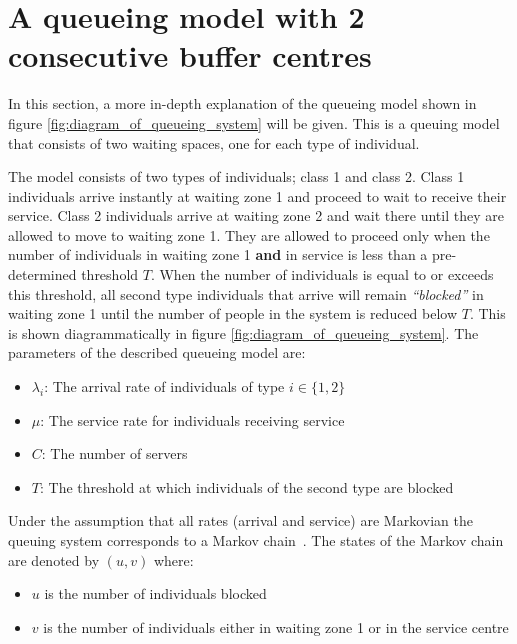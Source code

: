 \section{A queueing model with 2 consecutive buffer centres}

In this section, a more in-depth explanation of the queueing model shown in 
figure \ref{fig:diagram_of_queueing_system} will be given.
This is a queuing model that consists of two waiting spaces, one for each type
of individual.

The model consists of two types of individuals; class 1 and class 2.
Class 1 individuals arrive instantly at waiting zone 1 and proceed to wait to
receive their service. 
Class 2 individuals arrive at waiting zone 2 and wait there until they are 
allowed to move to waiting zone 1. 
They are allowed to proceed only when the number of 
individuals in waiting zone 1 \textbf{and} in service is less than a 
pre-determined threshold \(T\).
When the number of individuals is equal to or exceeds this threshold, all second type individuals that arrive will remain 
\textit{``blocked''} in waiting zone 1 until the number of people in the 
system is reduced below \(T\). 
This is shown diagrammatically in figure \ref{fig:diagram_of_queueing_system}.
The parameters of the described queueing model are:

\begin{itemize}
    \item \(\lambda_i\): The arrival rate of individuals of type \(i\in\{1, 2\}\)
    \item \(\mu\): The service rate for individuals receiving service
    \item \(C\): The number of servers
    \item \(T\): The threshold at which individuals of the second type are blocked
\end{itemize}

Under the assumption that all rates (arrival and service) are Markovian the
queuing system corresponds to a Markov chain~\cite{kemeny1976markov}.
The states of the Markov chain are denoted by \((u,v)\) where:

\begin{itemize}
    \item \(u\) is the number of individuals blocked
    \item \(v\) is the number of individuals either in waiting zone 1 or in the
    service centre
\end{itemize}

